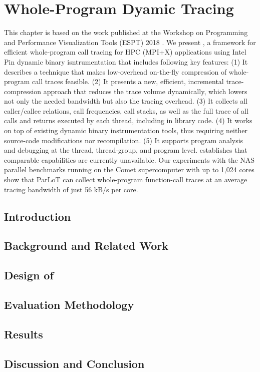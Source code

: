 
\chapter{Whole-Program Dyamic Tracing}

This chapter is based on the work published at the Workshop on Programming and Performance Visualization Tools (ESPT) 2018 \cite{parlot}.
We present \parlot, a framework for efficient whole-program call tracing for HPC (MPI+X) applications using Intel Pin \cite{pin} dynamic binary isntrumentation that includes following key features: (1) It describes a technique that makes low-overhead on-the-fly compression of whole-program call traces feasible. (2) It presents a new, efficient, incremental trace-compression approach that reduces the trace volume dynamically, which lowers not only the needed bandwidth but also the tracing overhead. (3) It collects all caller/callee relations, call frequencies, call stacks, as well as the full trace of all calls and returns executed by each thread, including in library code. (4) It works on top of existing dynamic binary instrumentation tools, thus requiring neither source-code modifications nor recompilation. (5) It supports program analysis and debugging at the thread, thread-group, and program level.
\parlot establishes that comparable capabilities are currently unavailable. Our experiments with the NAS parallel benchmarks running on the Comet supercomputer with up to 1,024 cores show that ParLoT can collect whole-program function-call traces at an average tracing bandwidth of just 56 kB/s per core.


\section{Introduction}
\label{sec:ch2_intro}



\section{Background and Related Work}
\label{sec:ch2_bgreltool}


\section{Design of \parlot}
\label{sec:ch2_design}


\section{Evaluation Methodology}
\label{sec:ch2_evalmeth}


\section{Results}
\label{sec:ch2_results}


\section{Discussion and Conclusion}
\label{sec:ch2_concl}

